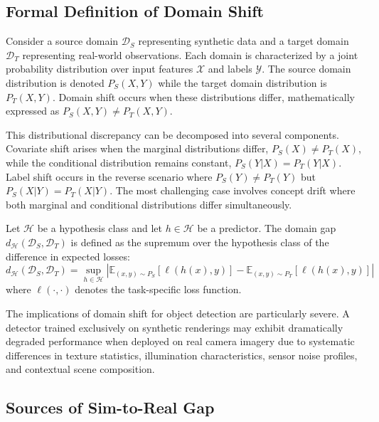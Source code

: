 \subsection{Formal Definition of Domain Shift}

Consider a source domain $\mathcal{D}_S$ representing synthetic data and a target domain $\mathcal{D}_T$ representing real-world observations. Each domain is characterized by a joint probability distribution over input features $\mathcal{X}$ and labels $\mathcal{Y}$. The source domain distribution is denoted $P_S(X, Y)$ while the target domain distribution is $P_T(X, Y)$. Domain shift occurs when these distributions differ, mathematically expressed as $P_S(X, Y) \neq P_T(X, Y)$.

This distributional discrepancy can be decomposed into several components. Covariate shift arises when the marginal distributions differ, $P_S(X) \neq P_T(X)$, while the conditional distribution remains constant, $P_S(Y|X) = P_T(Y|X)$. Label shift occurs in the reverse scenario where $P_S(Y) \neq P_T(Y)$ but $P_S(X|Y) = P_T(X|Y)$. The most challenging case involves concept drift where both marginal and conditional distributions differ simultaneously.

\begin{definition}
\label{def:domain_gap}
Let $\mathcal{H}$ be a hypothesis class and let $h \in \mathcal{H}$ be a predictor. The domain gap $d_{\mathcal{H}}(\mathcal{D}_S, \mathcal{D}_T)$ is defined as the supremum over the hypothesis class of the difference in expected losses:
\begin{equation}
d_{\mathcal{H}}(\mathcal{D}_S, \mathcal{D}_T) = \sup_{h \in \mathcal{H}} \left| \mathbb{E}_{(x,y) \sim P_S}[\ell(h(x), y)] - \mathbb{E}_{(x,y) \sim P_T}[\ell(h(x), y)] \right|
\end{equation}
where $\ell(\cdot, \cdot)$ denotes the task-specific loss function.
\end{definition}

The implications of domain shift for object detection are particularly severe. A detector trained exclusively on synthetic renderings may exhibit dramatically degraded performance when deployed on real camera imagery due to systematic differences in texture statistics, illumination characteristics, sensor noise profiles, and contextual scene composition.

\subsection{Sources of Sim-to-Real Gap}

